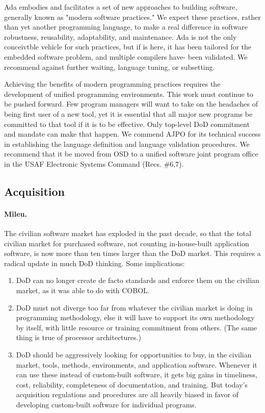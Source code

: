 \documentclass[12pt]{article}
\begin{document}
Ada embodies and facilitates a set of new approaches to building software,
generally known as "modern software practices." We expect these practices,
rather than yet another programming language, to make a real difference in
software robustness, reusability, adaptability, and maintenance. Ada is not
the only conceivtble vehicle for such practices, but if is here, it has been
tailored for the embedded software problem, and multiple compilers have- been
validated. We recommend against further waiting, language tuning, or
subsetting.

Achieving the benefits of modern programming practices requires the development of
unified programming environments. This work must continue to be pushed forward.
Few program managers will want to take on the headaches of being first user of a new
tool, yet it is essential that all major new programs be committed to that tool if it is to
be effective. Only top-level DoD commitment and mandate can make that happen.
We commend AJPO for its technical success in establishing the language definition and
language validation procedures. We recommend that it be moved from OSD to a unified
software joint program office in the USAF Electronic Systems Command (Recs. \#6,7).

\subsection*{Acquisition}

\paragraph{Mileu.} The civilian software market has exploded in the past decade, so that the total
civilian market for purchased software, not counting in-house-built application software, is
now more than ten times larger than the DoD market. This requires a radical update in
much DoD thinking. Some implications:

\begin{enumerate}
\item DoD can no longer create de facto standards and enforce them on the civilian market,
as it was able to do with COBOL.

\item DoD must not diverge too far from whatever the civilian market is doing in programming methodology, else it will have to support its own methodology by itself, with little
resource or training commitment from others. (The same thing is true of processor
architectures.)

\item DoD should be aggressively looking for opportunities to buy, in the civilian market,
tools, methods, environments, and application software. Whenever it can use these
instead of custom-built software, it gets big gains in timeliness, cost, reliability,
completeness of documentation, and training. But today's acquisition regulations
and procedures are all heavily biased in favor of developing custom-built software
for individual programs.
\end{enumerate}
\end{document}
